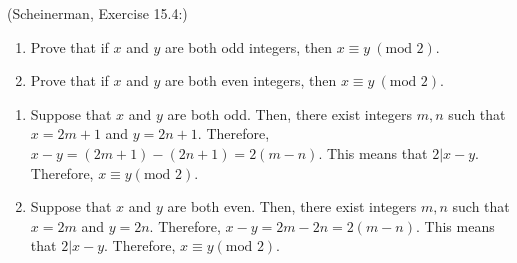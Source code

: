 \documentclass{article}
\newcommand{\modulo}{\text{mod }}
\theoremstyle{definition}
\begin{document}
\begin{question}
    (Scheinerman, Exercise 15.4:)
    \begin{enumerate}
        \item Prove that if $x$ and $y$ are both odd integers, then $x \equiv y \ (\modulo 2)$.
        \item Prove that if $x$ and $y$ are both even integers, then $x \equiv y \ (\modulo 2)$.
    \end{enumerate}
\end{question}
\begin{solution}
    \begin{enumerate}
    \item Suppose that $x$ and $y$ are both odd.  Then, there exist integers $m, n$ such that $x = 2m + 1$ and $y = 2n +1$.  Therefore, $x-y = (2m + 1) - (2n+1) = 2(m-n)$.  This means that $2|x-y$.  Therefore, $x \equiv y (\text{mod } 2)$.
    \item Suppose that $x$ and $y$ are both even.  Then, there exist integers $m, n$ such that $x = 2m$ and $y = 2n$.  Therefore, $x-y = 2m - 2n = 2(m-n)$.  This means that $2|x-y$.  Therefore, $x \equiv y (\text{mod } 2)$.
    \end{enumerate}
\end{solution}
\end{document}
